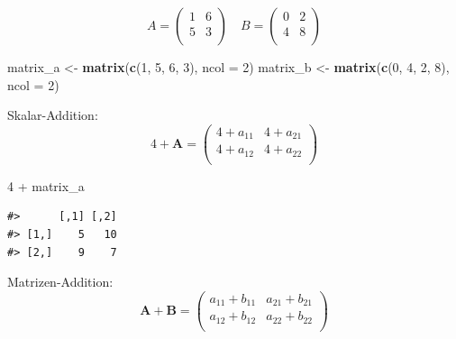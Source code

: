 \documentclass[]{tufte-book}
\newenvironment{Shaded}{}{}
\newcommand{\KeywordTok}[1]{\textcolor[rgb]{0.00,0.44,0.13}{\textbf{#1}}}
\newcommand{\DataTypeTok}[1]{\textcolor[rgb]{0.56,0.13,0.00}{#1}}
\newcommand{\DecValTok}[1]{\textcolor[rgb]{0.25,0.63,0.44}{#1}}
\newcommand{\StringTok}[1]{\textcolor[rgb]{0.25,0.44,0.63}{#1}}
\newcommand{\OperatorTok}[1]{\textcolor[rgb]{0.40,0.40,0.40}{#1}}
\newcommand{\NormalTok}[1]{#1}
\begin{document}
\[A = \left( 
\begin{array}{rrr}                                
1 & 6 \\                                               
5 & 3 \\                                               
\end{array}
\right) \quad B = \left( 
\begin{array}{rrr}                                
0 & 2 \\                                               
4 & 8 \\                                               
\end{array}\right)\]

\begin{Shaded}
\begin{Highlighting}[]
\NormalTok{matrix_a <-}\StringTok{ }\KeywordTok{matrix}\NormalTok{(}\KeywordTok{c}\NormalTok{(}\DecValTok{1}\NormalTok{, }\DecValTok{5}\NormalTok{, }\DecValTok{6}\NormalTok{, }\DecValTok{3}\NormalTok{), }\DataTypeTok{ncol =} \DecValTok{2}\NormalTok{)}
\NormalTok{matrix_b <-}\StringTok{ }\KeywordTok{matrix}\NormalTok{(}\KeywordTok{c}\NormalTok{(}\DecValTok{0}\NormalTok{, }\DecValTok{4}\NormalTok{, }\DecValTok{2}\NormalTok{, }\DecValTok{8}\NormalTok{), }\DataTypeTok{ncol =} \DecValTok{2}\NormalTok{)}
\end{Highlighting}
\end{Shaded}

Skalar-Addition: \[4+\boldsymbol{A}=
\left( 
\begin{array}{rrr}                                
4+a_{11} & 4+a_{21} \\                                               
4+a_{12} & 4+a_{22} \\                                               
\end{array}
\right)\]

\begin{Shaded}
\begin{Highlighting}[]
\DecValTok{4} \OperatorTok{+}\StringTok{ }\NormalTok{matrix_a}
\end{Highlighting}
\end{Shaded}

\begin{verbatim}
#>      [,1] [,2]
#> [1,]    5   10
#> [2,]    9    7
\end{verbatim}

Matrizen-Addition: \[\boldsymbol{A}+\boldsymbol{B}=
\left(
\begin{array}{rrr}                                
a_{11} + b_{11} & a_{21} + b_{21}\\                                               
a_{12} + b_{12} & a_{22} + b_{22}\\                                               
\end{array}
\right)\]
\end{document}
